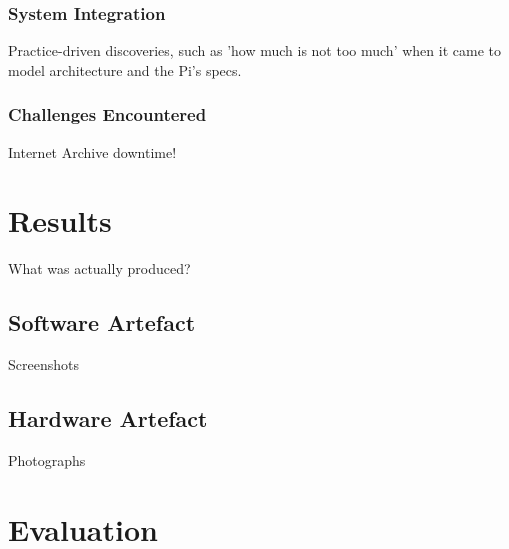             \subsubsection{System Integration}
                \begin{temp}
                    Practice-driven discoveries, such as 'how much is not too much' when it came to model   architecture and the Pi's specs.
                \end{temp}
            
            \subsubsection{Challenges Encountered}
    
                \begin{temp}
                    Internet Archive downtime!
                \end{temp}
    
    
    \section{Results} %
        \begin{temp}
            What was actually produced?
        \end{temp}
        \subsection{Software Artefact}
            \begin{temp}
                Screenshots
            \end{temp}
        
        \subsection{Hardware Artefact}
            \begin{temp}
                Photographs
            \end{temp}
    
    \section{Evaluation}
